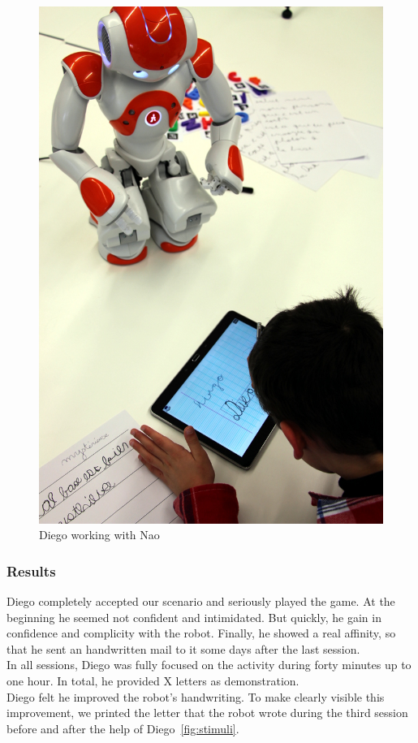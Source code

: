 \documentclass{article}
\begin{document}
\begin{figure}
    \centering
    \includegraphics[width=0.5\linewidth]{diego}
    \caption{\small Diego working with Nao}
    \label{fig:diego}
\end{figure}


\subsubsection{Results}
Diego completely accepted our scenario and seriously played the game. At the
beginning he seemed not confident and intimidated.  But quickly, he gain in
confidence and complicity with the robot. Finally, he showed a real affinity, so
that he sent an handwritten mail to it some days after the last
session.\\ 

In all sessions, Diego was fully focused on the activity during forty minutes up to one
hour. In total, he provided X letters as demonstration.\\

Diego felt he improved the robot's handwriting. To make clearly visible this
improvement, we printed the letter that the robot wrote during the third
session before and after the help of Diego~\ref{fig:stimuli}.
\end{document}
